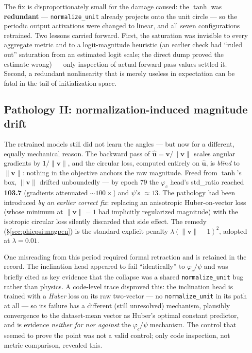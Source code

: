 \documentclass[11pt]{article}
\begin{document}
The fix is disproportionately small for the damage caused: the $\tanh$ was \textbf{redundant} --- \texttt{normalize\_unit} already projects onto the unit circle --- so the periodic output activations were changed to linear, and all seven configurations retrained.
Two lessons carried forward.
First, the saturation was invisible to every aggregate metric and to a logit-magnitude heuristic (an earlier check had ``ruled out'' saturation from an estimated logit scale; the direct dump proved the estimate wrong) --- only inspection of actual forward-pass values settled it.
Second, a redundant nonlinearity that is merely useless in expectation can be fatal in the tail of initialization space.

\subsection{Pathology II: normalization-induced magnitude drift}
\label{sec:phicpsi:pathology2}

The retrained models still did not learn the angles --- but now for a different, equally mechanical reason.
The backward pass of $\hat{\mathbf{u}} = \mathbf{v}/\lVert\mathbf{v}\rVert$ scales angular gradients by $1/\lVert\mathbf{v}\rVert$, and the circular loss, computed entirely on $\hat{\mathbf{u}}$, is \emph{blind} to $\lVert\mathbf{v}\rVert$: nothing in the objective anchors the raw magnitude.
Freed from $\tanh$'s box, $\lVert\mathbf{v}\rVert$ drifted unboundedly --- by epoch 79 the $\varphi_c$ head's std\_ratio reached \textbf{103.7} (gradients attenuated ${\sim}100\times$) and $\psi$'s $\approx 13$.
The pathology had been introduced \emph{by an earlier correct fix}: replacing an anisotropic Huber-on-vector loss (whose minimum at $\lVert\mathbf{v}\rVert = 1$ had implicitly regularized magnitude) with the isotropic circular loss silently discarded that side effect.
The remedy (\S\ref{sec:phicpsi:magpen}) is the standard explicit penalty $\lambda(\lVert\mathbf{v}\rVert - 1)^2$, adopted at $\lambda = 0.01$.

One misreading from this period required formal retraction and is retained in the record.
The inclination head appeared to fail ``identically'' to $\varphi_c/\psi$ and was briefly cited as key evidence that the collapse was a shared \texttt{normalize\_unit} bug rather than physics.
A code-level trace disproved this: the inclination head is trained with a \emph{Huber} loss on its raw two-vector --- no \texttt{normalize\_unit} in its path at all --- so its failure has a different (still unresolved) mechanism, plausibly convergence to the dataset-mean vector as Huber's optimal constant predictor, and is evidence \emph{neither for nor against} the $\varphi_c/\psi$ mechanism.
The control that seemed to prove the point was not a valid control; only code inspection, not metric comparison, revealed this.
\end{document}
